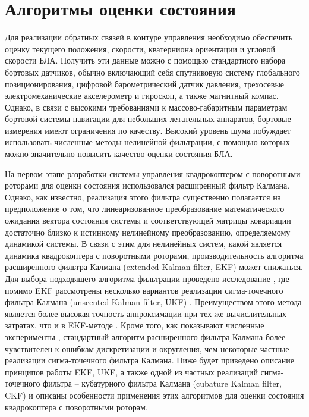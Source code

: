 
\chapter{Алгоритмы оценки состояния}
\label{chapter_estimation}

Для реализации обратных связей в контуре управления необходимо обеспечить оценку текущего положения, скорости, кватерниона ориентации и угловой скорости БЛА. Получить эти данные можно с помощью стандартного набора бортовых датчиков, обычно включающий себя спутниковую систему глобального позиционирования, цифровой барометрический датчик давления, трехосевые электромеханические акселерометр и гироскоп, а также магнитный компас. Однако, в связи с высокими требованиями к массово-габаритным параметрам бортовой системы навигации для небольших летательных аппаратов, бортовые измерения имеют ограничения по качеству. Высокий уровень шума побуждает использовать численные методы нелинейной фильтрации, с помощью которых можно значительно повысить качество оценки состояния БЛА.

На первом этапе разработки системы управления квадрокоптером с поворотными роторами для оценки состояния использовался расширенный фильтр Калмана. Однако, как известно, реализация этого фильтра существенно полагается на предположение о том, что линеаризованное преобразование математического ожидания вектора состояния системы и соответствующей матрицы ковариации достаточно близко к истинному нелинейному преобразованию, определяемому динамикой системы. В связи с этим для нелинейных систем, какой является динамика квадрокоптера с поворотными роторами, производительность алгоритма расширенного фильтра Калмана (extended Kalman filter, EKF) может снижаться.
Для выбора подходящего алгоритма фильтрации проведено исследование \cite{Shavin02}, где помимо EKF рассмотрены несколько вариантов реализации сигма-точечного фильтра Калмана (unscented Kalman filter, UKF) \cite{Julier01, Julier02}. Преимуществом этого метода является более высокая точность аппроксимации при тех же вычислительных затратах, что и в EKF-методе \cite{Kulikova01}. Кроме того, как показывают численные эксперименты \cite{Shavin01}, стандартный алгоритм расширенного фильтра Калмана более чувствителен к ошибкам дискретизации и округления, чем некоторые частные реализации сигма-точечного фильтра Калмана. Ниже будет приведено описание принципов работы EKF, UKF, а также одной из частных реализаций сигма-точечного фильтра -- кубатурного фильтра Калмана (cubature Kalman filter, CKF) и описаны особенности применения этих алгоритмов для оценки состояния квадрокоптера с поворотными роторам.


